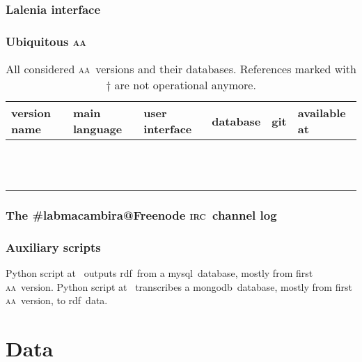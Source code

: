 \documentclass[a4paper, 11pt]{article} %
\newcommand{\irc}{\textsc{irc}}
\newcommand{\aab}{\textsc{aa}}
\newcommand{\mongodb}{{\sc m}ongo{\sc db}}
\newcommand{\mysql}{{\sc m}y{\sc sql}}
\newcommand{\rdf}{{\sc rdf}}
\begin{document}
\subsubsection{Lalenia interface}\label{sec:lalenia}
\subsubsection{Ubiquitous \aab}\label{sec:ubi}

\begin{table}[!h]
  \centering
  \caption{All considered \aab\ versions and their databases. References marked with $\dagger$ are not operational anymore.}\label{tab:aas}
  \begin{tabular}{|l|l|l|l|l|l|}\hline
      {\bf version name} & {\bf main language} & {\bf user interface} & {\bf database} & {\bf git} & {\bf available at} \\\hline\hline
& & & & & \\\hline
& & & & & \\\hline
& & & & & \\\hline
& & & & & \\\hline
& & & & & \\\hline
& & & & & \\\hline
& & & & & \\\hline
& & & & & \\\hline
& & & & & \\\hline
& & & & & \\\hline
& & & & & \\\hline
& & & & & \\\hline
  \end{tabular}
\end{table}

\subsubsection{The \#labmacambira@Freenode \irc\ channel log}
\subsubsection{Auxiliary scripts}
Python script at~\cite{mysqlTri} outputs \rdf\ from a \mysql\ database, mostly from first \aab\ version.
Python script at~\cite{mongoTri} transcribes a \mongodb\ database, mostly from first \aab\ version, to \rdf\ data.

\section{Data}\label{sec:data}
\end{document}
